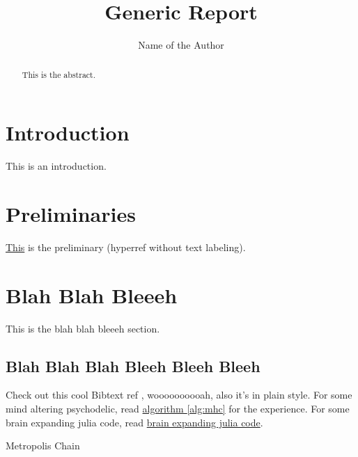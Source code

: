 \documentclass[]{article}
\title{Generic Report}
\author{Name of the Author}
\theoremstyle{definition}
\numberwithin{equation}{subsection}
\begin{document}
\maketitle

\begin{abstract}
    This is the abstract. 
\end{abstract}


\section{Introduction}
    This is an introduction. 

\section{Preliminaries}\label{sec:preliminaries}
    \hyperref[sec:preliminaries]{This} is the preliminary (hyperref without text labeling). 
    
\section{Blah Blah Bleeeh}
    This is the blah blah bleeeh section. 
    \subsection{Blah Blah Blah Bleeh Bleeh Bleeh}
    Check out this cool Bibtext ref \cite[this]{texbook}, woooooooooah, also it's in plain style. For some mind altering psychodelic, read \hyperref[alg:mhc]{algorithm \ref*{alg:mhc}} for the experience. For some brain expanding julia code, read \hyperref[code:brain_expand]{brain expanding julia code}. 
    \begin{algorithm}
        \begin{algorithmic}[t]
        \end{algorithmic}
        \caption{Metropolis Chain}
        \label{alg:mhc}
    \end{algorithm}
    \label{code:brain_expand}
    
    
\end{document}
